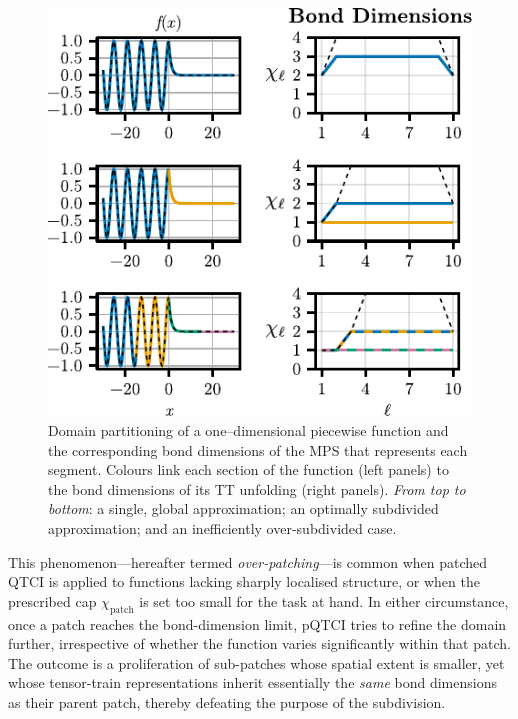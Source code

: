 \begin{figure}[ht!]
	\centering 
	\includegraphics{figures/1DOverpatchingBonddim.pdf}
	\caption{Domain partitioning of a one–dimensional piecewise function and the corresponding bond dimensions of the MPS that represents each segment\protect\footnotemark . Colours link each section of the function (left panels) to the bond dimensions of its TT unfolding (right panels).  \textit{From top to bottom}: a single, global approximation; an optimally subdivided approximation; and an inefficiently over-subdivided case.}
	\label{fig:1DOverpatchingBonddim}
\end{figure}

This phenomenon—hereafter termed \emph{over-patching}—is common when patched QTCI is applied to functions lacking sharply localised structure, or when the prescribed cap $\chi_{\text{patch}}$ is set too small for the task at hand.  
In either circumstance, once a patch reaches the bond-dimension limit, pQTCI tries to refine the domain further, irrespective of whether the function varies significantly within that patch.  
The outcome is a proliferation of sub-patches whose spatial extent is smaller, yet whose tensor-train representations inherit essentially the \emph{same} bond dimensions as their parent patch, thereby defeating the purpose of the subdivision.



